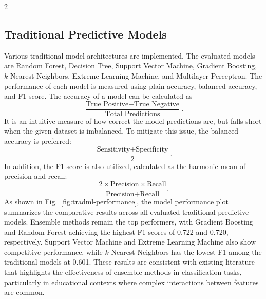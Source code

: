 \begin{multicols}{2}

\subsection{Traditional Predictive Models}
Various traditional model architectures are implemented. The evaluated models are Random Forest, Decision Tree, Support Vector Machine, Gradient Boosting, $k$-Nearest Neighbors, Extreme Learning Machine, and Multilayer Perceptron. The performance of each model is measured using plain accuracy, balanced accuracy, and F1 score. The accuracy of a model can be calculated as
\[
	\frac{\text{True Positive} + \text{True Negative}}{\text{Total Predictions}}.
\]
It is an intuitive measure of how correct the model predictions are, but falls short when the given dataset is imbalanced. To mitigate this issue, the balanced accuracy is preferred:
\[
	\frac{\text{Sensitivity} + \text{Specificity}}{2}.
\]
In addition, the F1-score is also utilized, calculated as the harmonic mean of precision and recall:
\[
	\frac{2 \times \text{Precision} \times \text{Recall}}{\text{Precision} + \text{Recall}}.
\]
As shown in Fig.~\ref{fig:tradml-performance}, the model performance plot summarizes the comparative results across all evaluated traditional predictive models. Ensemble methods remain the top performers, with Gradient Boosting and Random Forest achieving the highest F1 scores of 0.722 and 0.720, respectively. Support Vector Machine and Extreme Learning Machine also show competitive performance, while $k$-Nearest Neighbors has the lowest F1 among the traditional models at 0.601. These results are consistent with existing literature that highlights the effectiveness of ensemble methods in classification tasks, particularly in educational contexts where complex interactions between features are common.


\end{multicols}
